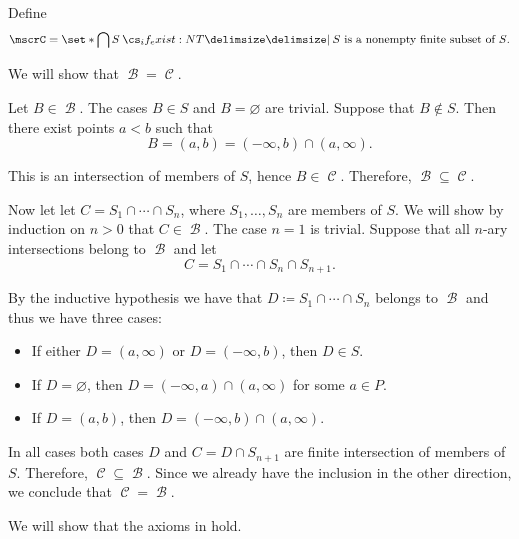 \begin{defproof}
   Define
  \begin{equation*}
    \mscrC = \set*{ \bigcap S \given* S \text{ is a nonempty finite subset of } S }.
  \end{equation*}

  We will show that \( \mscrB = \mscrC \).

  Let \( B \in \mscrB \). The cases \( B \in S \) and \( B = \varnothing \) are trivial. Suppose that \( B \not\in S \). Then there exist points \( a < b \) such that
  \begin{equation*}
    B = (a, b) = (-\infty, b) \cap (a, \infty).
  \end{equation*}

  This is an intersection of members of \( S \), hence \( B \in \mscrC \). Therefore, \( \mscrB \subseteq \mscrC \).

  Now let let \( C = S_1 \cap \cdots \cap S_n \), where \( S_1, \ldots, S_n \) are members of \( S \). We will show by induction on \( n > 0 \) that \( C \in \mscrB \). The case \( n = 1 \) is trivial. Suppose that all \( n \)-ary intersections belong to \( \mscrB \) and let
  \begin{equation*}
    C = S_1 \cap \cdots \cap S_n \cap S_{n+1}.
  \end{equation*}

  By the inductive hypothesis we have that \( D \coloneqq S_1 \cap \cdots \cap S_n \) belongs to \( \mscrB \) and thus we have three cases:
  \begin{itemize}
    \item If either \( D = (a, \infty) \) or \( D = (-\infty, b) \), then \( D \in S \).
    \item If \( D = \varnothing \), then \( D = (-\infty, a) \cap (a, \infty) \) for some \( a \in P \).
    \item If \( D = (a, b) \), then \( D = (-\infty, b) \cap (a, \infty) \).
  \end{itemize}

  In all cases both cases \( D \) and \( C = D \cap S_{n+1} \) are finite intersection of members of \( S \). Therefore, \( \mscrC \subseteq \mscrB \). Since we already have the inclusion in the other direction, we conclude that \( \mscrC = \mscrB \).

   We will show that the axioms in  hold.


\end{defproof}
